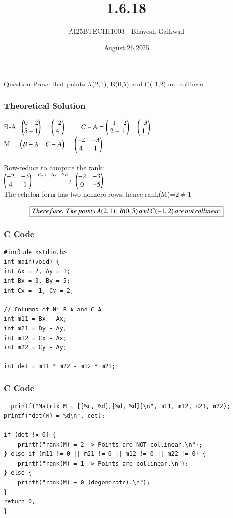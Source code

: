 \documentclass{beamer}
\title
{1.6.18}
\date{August 26,2025}
\author 
{AI25BTECH11003 - Bhavesh Gaikwad}
\begin{document}
\frame{\titlepage}
\begin{frame}{Question}
\centering
Prove that points A(2,1), B(0,5) and C(-1,2) are collinear.
\end{frame}


\begin{frame}[fragile]
    \frametitle{Theoretical Solution}
B-A=$\begin{pmatrix}0-2 \\ 5-1\end{pmatrix}$ = $\begin{pmatrix}-2 \\ 4\end{pmatrix}$
$\qquad C-A=\begin{pmatrix}-1-2 \\ 2-1\end{pmatrix}$ =$\begin{pmatrix}-3 \\ 1\end{pmatrix}$ \\
M = $\begin{pmatrix}B-A & C-A\end{pmatrix}$ = $\begin{pmatrix}-2 & -3 \\ 4 & 1\end{pmatrix}$\\\\

Row-reduce to compute the rank:\\

$\begin{pmatrix}-2 & -3\\ 4 & 1\end{pmatrix}$ $\xrightarrow{\;R_2\leftarrow R_2+2R_1\;}$ $\begin{pmatrix}-2 & -3 \\ 0 & -5\end{pmatrix}$\\

The echelon form has two nonzero rows, hence
rank(M)=2$\neq$1

\begin{align}
    \centering
    \boxed{Therefore, \, The \, points \, A(2,1), \,B(0,5) \, and \, C(-1,2) \, are \, not \, collinear.}
\end{align}
\end{frame}


\begin{frame}[fragile]
    \frametitle{C Code}
    \begin{lstlisting}
#include <stdio.h>
int main(void) {
int Ax = 2, Ay = 1;
int Bx = 0, By = 5;
int Cx = -1, Cy = 2;

// Columns of M: B-A and C-A
int m11 = Bx - Ax; 
int m21 = By - Ay; 
int m12 = Cx - Ax; 
int m22 = Cy - Ay; 

int det = m11 * m22 - m12 * m21;
 \end{lstlisting}
\end{frame}


\begin{frame}[fragile]
    \frametitle{C Code}
    \begin{lstlisting}
  printf("Matrix M = [[%d, %d],[%d, %d]]\n", m11, m12, m21, m22);
printf("det(M) = %d\n", det);

if (det != 0) {
    printf("rank(M) = 2 -> Points are NOT collinear.\n");
} else if (m11 != 0 || m21 != 0 || m12 != 0 || m22 != 0) {
    printf("rank(M) = 1 -> Points are collinear.\n");
} else {
    printf("rank(M) = 0 (degenerate).\n");
}
return 0;
}
    \end{lstlisting}
\end{frame}
\end{document}

